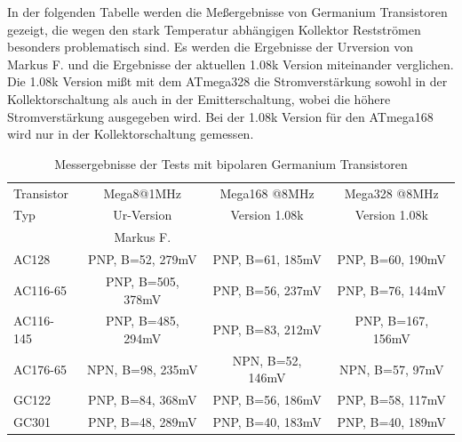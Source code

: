 In der folgenden Tabelle werden die Meßergebnisse von Germanium Transistoren gezeigt, die wegen den
stark Temperatur abhängigen Kollektor Restströmen besonders problematisch sind.
Es werden die Ergebnisse der Urversion von Markus F. und die Ergebnisse der aktuellen 1.08k Version
miteinander verglichen. Die 1.08k Version mißt mit dem ATmega328 die Stromverstärkung sowohl in der
Kollektorschaltung als auch in der Emitterschaltung, wobei die höhere Stromverstärkung ausgegeben wird.
Bei der 1.08k Version für den ATmega168 wird nur in der Kollektorschaltung gemessen.

\begin{table}[H]
  \begin{center}
    \begin{tabular}{| l | c | c | c |}
    \hline
 Transistor & Mega8@1MHz          & Mega168 @8MHz       & Mega328 @8MHz    \\
    Typ     & Ur-Version          & Version 1.08k       & Version 1.08k  \\
            & Markus F.           &                     &        \\
    \hline
    \hline
AC128       & PNP, B=52, 279mV    & PNP, B=61, 185mV    & PNP, B=60, 190mV    \\
    \hline
AC116-65    & PNP, B=505, 378mV   & PNP, B=56, 237mV    & PNP, B=76, 144mV    \\
    \hline
AC116-145   & PNP, B=485, 294mV   & PNP, B=83, 212mV    & PNP, B=167, 156mV   \\
    \hline
AC176-65    & NPN, B=98, 235mV    & NPN, B=52, 146mV    & NPN, B=57, 97mV     \\
    \hline
GC122       & PNP, B=84, 368mV    & PNP, B=56, 186mV    & PNP, B=58, 117mV    \\
    \hline
GC301       & PNP, B=48, 289mV    & PNP, B=40, 183mV    & PNP, B=40, 189mV    \\
    \hline
    \end{tabular}
  \end{center}
  \caption{Messergebnisse der Tests mit bipolaren Germanium Transistoren}
  \label{tab:germanium} 
\end{table}

